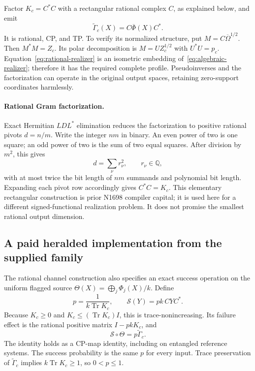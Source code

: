 \documentclass[11pt,a4paper]{article}
\theoremstyle{definition}\newtheorem{definition}[theorem]{Definition}
\newcommand{\Tr}{\operatorname{Tr}}
\newcommand{\Q}{\mathbb Q}
\begin{document}
Factor $K_c=C^*C$ with a rectangular rational complex $C$, as explained below, and emit
\begin{equation}\label{eq:rational-realizer}
 \widetilde\Gamma_c(X)=C\overline\Phi(X)C^*.
\end{equation}
It is rational, CP, and TP. To verify its normalized structure, put $M=C\overline\Omega^{1/2}$. Then $M^*M=Z_c$. Its polar decomposition is $M=UZ_c^{1/2}$ with $U^*U=p_c$. Equation~\eqref{eq:rational-realizer} is an isometric embedding of~\eqref{eq:algebraic-realizer}; therefore it has the required complete profile. Pseudoinverses and the factorization can operate in the original output spaces, retaining zero-support coordinates harmlessly.

\paragraph{Rational Gram factorization.}
Exact Hermitian $LDL^*$ elimination reduces the factorization to positive rational pivots $d=n/m$. Write the integer $nm$ in binary. An even power of two is one square; an odd power of two is the sum of two equal squares. After division by $m^2$, this gives
\[
 d=\sum_\nu r_\nu^2,\qquad r_\nu\in\Q,
\]
with at most twice the bit length of $nm$ summands and polynomial bit length. Expanding each pivot row accordingly gives $C^*C=K_c$. This elementary rectangular construction is prior N1698 compiler capital; it is used here for a different signed-functional realization problem. It does not promise the smallest rational output dimension.

\subsection{A paid heralded implementation from the supplied family}

The rational channel construction also specifies an exact success operation on the uniform flagged source $\Theta(X)=\bigoplus_j\Phi_j(X)/k$. Define
\begin{equation}\label{eq:herald}
 p=\frac1{k\Tr K_c},\qquad
 \mathcal S(Y)=pk\,CYC^*.
\end{equation}
Because $K_c\ge0$ and $K_c\le(\Tr K_c)I$, this is trace-nonincreasing. Its failure effect is the rational positive matrix $I-pkK_c$, and
\begin{equation}\label{eq:success}
 \mathcal S\circ\Theta=p\widetilde\Gamma_c.
\end{equation}
The identity holds as a CP-map identity, including on entangled reference systems. The success probability is the same $p$ for every input. Trace preservation of $\widetilde\Gamma_c$ implies $k\Tr K_c\ge1$, so $0<p\le1$.
\end{document}
